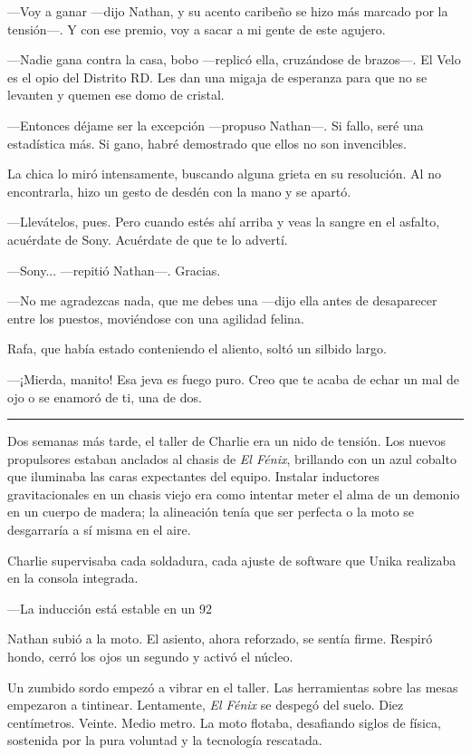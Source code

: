 \documentclass[12pt,a4paper]{book}
\begin{document}
---Voy a ganar ---dijo Nathan, y su acento caribeño se hizo más marcado por la tensión---. Y con ese premio, voy a sacar a mi gente de este agujero.

---Nadie gana contra la casa, bobo ---replicó ella, cruzándose de brazos---. El Velo es el opio del Distrito RD. Les dan una migaja de esperanza para que no se levanten y quemen ese domo de cristal.

---Entonces déjame ser la excepción ---propuso Nathan---. Si fallo, seré una estadística más. Si gano, habré demostrado que ellos no son invencibles.

La chica lo miró intensamente, buscando alguna grieta en su resolución. Al no encontrarla, hizo un gesto de desdén con la mano y se apartó.

---Llevátelos, pues. Pero cuando estés ahí arriba y veas la sangre en el asfalto, acuérdate de Sony. Acuérdate de que te lo advertí.

---Sony... ---repitió Nathan---. Gracias.

---No me agradezcas nada, que me debes una ---dijo ella antes de desaparecer entre los puestos, moviéndose con una agilidad felina.

Rafa, que había estado conteniendo el aliento, soltó un silbido largo.

---¡Mierda, manito! Esa jeva es fuego puro. Creo que te acaba de echar un mal de ojo o se enamoró de ti, una de dos.

\bigskip
\noindent\rule{\textwidth}{0.4pt}
\bigskip

Dos semanas más tarde, el taller de Charlie era un nido de tensión. Los nuevos propulsores estaban anclados al chasis de \textit{El Fénix}, brillando con un azul cobalto que iluminaba las caras expectantes del equipo. Instalar inductores gravitacionales en un chasis viejo era como intentar meter el alma de un demonio en un cuerpo de madera; la alineación tenía que ser perfecta o la moto se desgarraría a sí misma en el aire.

Charlie supervisaba cada soldadura, cada ajuste de software que Unika realizaba en la consola integrada.

---La inducción está estable en un 92%

Nathan subió a la moto. El asiento, ahora reforzado, se sentía firme. Respiró hondo, cerró los ojos un segundo y activó el núcleo.

Un zumbido sordo empezó a vibrar en el taller. Las herramientas sobre las mesas empezaron a tintinear. Lentamente, \textit{El Fénix} se despegó del suelo. Diez centímetros. Veinte. Medio metro. La moto flotaba, desafiando siglos de física, sostenida por la pura voluntad y la tecnología rescatada.
\end{document}
